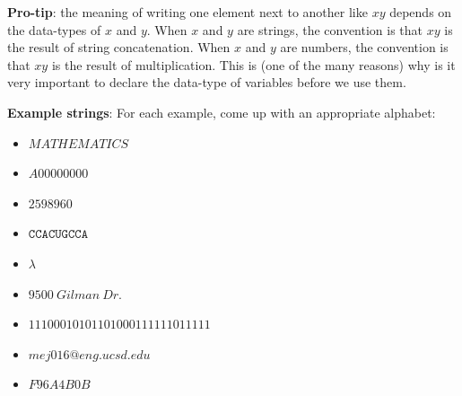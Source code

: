 \documentclass[12pt, oneside]{article}
\newcommand{\A}[0]{\texttt{A}}
\newcommand{\C}[0]{\texttt{C}}
\newcommand{\G}[0]{\texttt{G}}
\newcommand{\U}[0]{\texttt{U}}
\begin{document}
{\bf Pro-tip}: the meaning of writing one element next to another like $xy$ depends on the data-types of $x$ and 
$y$. When $x$ and $y$ are strings, the convention is that $xy$ is the result of string concatenation. 
When $x$ and $y$ are numbers, the convention is that $xy$ is the result of multiplication. This is 
(one of the many reasons) why is it very important to declare the data-type of variables before we use them.


{\bf Example strings}: For each example, come up with an appropriate alphabet:
\begin{itemize}
    \item[]$MATHEMATICS$\\
    \item[]$A00000000$\\
    \item[]$2598960$\\
    \item[]$\C\C\A\C\U\G\C\C\A$\\
    \item[]$\lambda$\\
    \item[]$9500~Gilman~Dr.$\\
    \item[]$11100010101101000111111011111$\\
    \item[]$mej016@eng.ucsd.edu$ \\
    \item[]$F96A4B0B$
\end{itemize}
\end{document}
